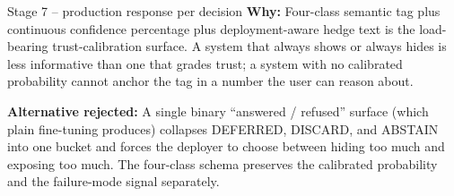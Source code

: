 \documentclass[10pt,aspectratio=169]{beamer}
\newcommand{\why}[1]{{\color{caemamber}\textbf{Why:}} #1}
\newcommand{\altn}[1]{{\color{caemred}\textbf{Alternative rejected:}} #1}
\begin{document}
\begin{frame}{Stage 7 -- production response per decision}
  \why{Four-class semantic tag plus continuous confidence percentage plus deployment-aware hedge text is the load-bearing trust-calibration surface. A system that always shows or always hides is less informative than one that grades trust; a system with no calibrated probability cannot anchor the tag in a number the user can reason about.}

  \altn{A single binary ``answered / refused'' surface (which plain fine-tuning produces) collapses DEFERRED, DISCARD, and ABSTAIN into one bucket and forces the deployer to choose between hiding too much and exposing too much. The four-class schema preserves the calibrated probability and the failure-mode signal separately.}
\end{frame}

\end{document}
